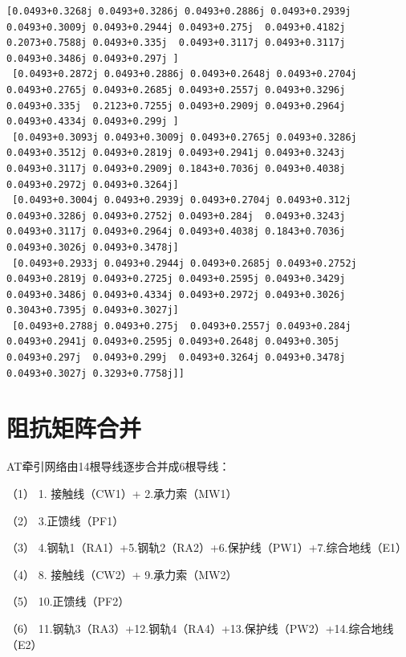\documentclass[11pt]{article}
\begin{document}
\begin{Verbatim}[commandchars=\\\{\}]
 [0.0493+0.3268j 0.0493+0.3286j 0.0493+0.2886j 0.0493+0.2939j 0.0493+0.3009j 0.0493+0.2944j 0.0493+0.275j  0.0493+0.4182j 0.2073+0.7588j 0.0493+0.335j  0.0493+0.3117j 0.0493+0.3117j 0.0493+0.3486j 0.0493+0.297j ]
 [0.0493+0.2872j 0.0493+0.2886j 0.0493+0.2648j 0.0493+0.2704j 0.0493+0.2765j 0.0493+0.2685j 0.0493+0.2557j 0.0493+0.3296j 0.0493+0.335j  0.2123+0.7255j 0.0493+0.2909j 0.0493+0.2964j 0.0493+0.4334j 0.0493+0.299j ]
 [0.0493+0.3093j 0.0493+0.3009j 0.0493+0.2765j 0.0493+0.3286j 0.0493+0.3512j 0.0493+0.2819j 0.0493+0.2941j 0.0493+0.3243j 0.0493+0.3117j 0.0493+0.2909j 0.1843+0.7036j 0.0493+0.4038j 0.0493+0.2972j 0.0493+0.3264j]
 [0.0493+0.3004j 0.0493+0.2939j 0.0493+0.2704j 0.0493+0.312j  0.0493+0.3286j 0.0493+0.2752j 0.0493+0.284j  0.0493+0.3243j 0.0493+0.3117j 0.0493+0.2964j 0.0493+0.4038j 0.1843+0.7036j 0.0493+0.3026j 0.0493+0.3478j]
 [0.0493+0.2933j 0.0493+0.2944j 0.0493+0.2685j 0.0493+0.2752j 0.0493+0.2819j 0.0493+0.2725j 0.0493+0.2595j 0.0493+0.3429j 0.0493+0.3486j 0.0493+0.4334j 0.0493+0.2972j 0.0493+0.3026j 0.3043+0.7395j 0.0493+0.3027j]
 [0.0493+0.2788j 0.0493+0.275j  0.0493+0.2557j 0.0493+0.284j  0.0493+0.2941j 0.0493+0.2595j 0.0493+0.2648j 0.0493+0.305j  0.0493+0.297j  0.0493+0.299j  0.0493+0.3264j 0.0493+0.3478j 0.0493+0.3027j 0.3293+0.7758j]]

    \end{Verbatim}

    \section{阻抗矩阵合并}\label{ux963bux6297ux77e9ux9635ux5408ux5e76}

    AT牵引网络由14根导线逐步合并成6根导线：

（1） 1. 接触线（CW1）+ 2.承力索（MW1）

（2） 3.正馈线（PF1）

（3） 4.钢轨1（RA1）+5.钢轨2（RA2）+6.保护线（PW1）+7.综合地线（E1）

（4） 8. 接触线（CW2）+ 9.承力索（MW2）

（5） 10.正馈线（PF2）

（6） 11.钢轨3（RA3）+12.钢轨4（RA4）+13.保护线（PW2）+14.综合地线（E2）
\end{document}
